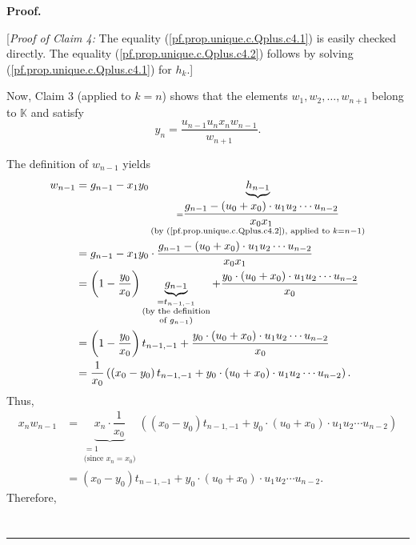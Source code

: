 \documentclass[numbers=enddot,12pt,final,onecolumn,notitlepage]{scrartcl}%
\theoremstyle{definition}
\newenvironment{statement}{\begin{quote}}{\end{quote}}
\newenvironment{proof}[1][Proof]{\noindent\textbf{#1.} }{\ \rule{0.5em}{0.5em}}
\newenvironment{verlong}{}{}
\begin{document}
\begin{verlong}
\begin{proof}
\begin{statement}
\end{statement}

[\textit{Proof of Claim 4:} The equality (\ref{pf.prop.unique.c.Qplus.c4.1})
is easily checked directly. The equality (\ref{pf.prop.unique.c.Qplus.c4.2})
follows by solving (\ref{pf.prop.unique.c.Qplus.c4.1}) for $h_{k}$.]

Now, Claim 3 (applied to $k=n$) shows that the elements $w_{1},w_{2}%
,\ldots,w_{n+1}$ belong to $\mathbb{K}$ and satisfy
\begin{equation}
y_{n}=\dfrac{u_{n-1}u_{n}x_{n}w_{n-1}}{w_{n+1}}.
\label{pf.prop.unique.c.Qplus.yn}%
\end{equation}


The definition of $w_{n-1}$ yields%
\begin{align*}
w_{n-1}  &  =g_{n-1}-x_{1}y_{0}\underbrace{h_{n-1}}_{\substack{=\dfrac
{g_{n-1}-\left(  u_{0}+x_{0}\right)  \cdot u_{1}u_{2}\cdots u_{n-2}}%
{x_{0}x_{1}}\\\text{(by (\ref{pf.prop.unique.c.Qplus.c4.2}), applied to
}k=n-1\text{)}}}\\
&  =g_{n-1}-x_{1}y_{0}\cdot\dfrac{g_{n-1}-\left(  u_{0}+x_{0}\right)  \cdot
u_{1}u_{2}\cdots u_{n-2}}{x_{0}x_{1}}\\
&  =\left(  1-\dfrac{y_{0}}{x_{0}}\right)  \underbrace{g_{n-1}}%
_{\substack{=t_{n-1,-1}\\\text{(by the definition}\\\text{of }g_{n-1}\text{)}%
}}+\dfrac{y_{0}\cdot\left(  u_{0}+x_{0}\right)  \cdot u_{1}u_{2}\cdots
u_{n-2}}{x_{0}}\\
&  =\left(  1-\dfrac{y_{0}}{x_{0}}\right)  t_{n-1,-1}+\dfrac{y_{0}\cdot\left(
u_{0}+x_{0}\right)  \cdot u_{1}u_{2}\cdots u_{n-2}}{x_{0}}\\
&  =\dfrac{1}{x_{0}}\left(  \left(  x_{0}-y_{0}\right)  t_{n-1,-1}+y_{0}%
\cdot\left(  u_{0}+x_{0}\right)  \cdot u_{1}u_{2}\cdots u_{n-2}\right)  .
\end{align*}
Thus,%
\begin{align*}
x_{n}w_{n-1}  &  =\underbrace{x_{n}\cdot\dfrac{1}{x_{0}}}%
_{\substack{=1\\\text{(since }x_{n}=x_{0}\text{)}}}\left(  \left(  x_{0}%
-y_{0}\right)  t_{n-1,-1}+y_{0}\cdot\left(  u_{0}+x_{0}\right)  \cdot
u_{1}u_{2}\cdots u_{n-2}\right) \\
&  =\left(  x_{0}-y_{0}\right)  t_{n-1,-1}+y_{0}\cdot\left(  u_{0}%
+x_{0}\right)  \cdot u_{1}u_{2}\cdots u_{n-2}.
\end{align*}
Therefore,%
\begin{align}

\end{align}
\end{proof}
\end{verlong}
\end{document}
